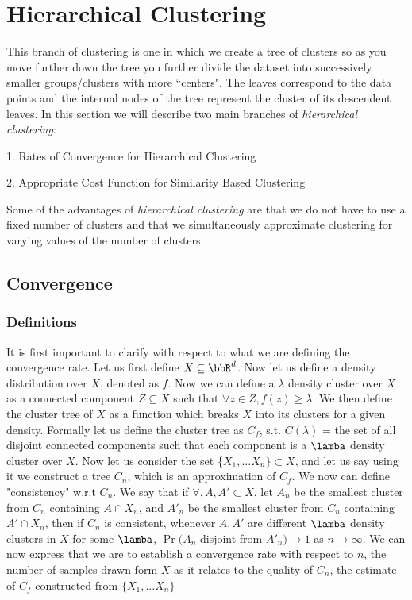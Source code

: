 \documentclass{article}
\begin{document}
\section{Hierarchical Clustering}

This branch of clustering is one in which we create a tree of clusters so as you move further down the tree you further divide the dataset into successively smaller groups/clusters with more ``centers". The leaves correspond to the data points and the internal nodes of the tree represent the cluster of its descendent leaves. In this section we will describe two main branches of \textit{hierarchical clustering}: 


1. Rates of Convergence for Hierarchical Clustering

2. Appropriate Cost Function for Similarity Based Clustering

Some of the advantages of \textit{hierarchical clustering} are that we do not have to use a fixed number of clusters and that we simultaneously approximate clustering for varying values of the number of clusters.

\subsection{Convergence}

\subsubsection{Definitions}
It is first important to clarify with respect to what we are defining the convergence rate.  Let us first define $X \subseteq \bbR^d$.  Now let us define a density distribution over $X$, denoted as $f$.  Now we can define a  $\lambda$  density cluster over $X$ as a connected component $Z \subseteq X$ such that $\forall z \in Z, f(z) \geq \lambda$.  We then define the cluster tree of $X$ as a function which breaks $X$ into its clusters for a given density.  Formally let us define the cluster tree as $C_f$, s.t. $C(\lambda)$ = the set of all disjoint connected components such that each component is a $\lamba$ density cluster over $X$.  Now let us consider the set \{$X_1, ... X_n\} \subset X$, and let us say using it we construct a tree $C_n$, which is an approximation of $C_f$.  We now can define "consistency" w.r.t $C_n$.  We say that if $\forall, A, A' \subset X$, let $A_n$ be the smallest cluster from $C_n$ containing $A \cap X_n$, and $A'_n$ be the smallest cluster from $C_n$ containing $A' \cap X_n$, then if $C_n$ is consistent, whenever $A, A'$ are different $\lamba$ density clusters in $X$ for some $\lamba$, $\Pr(A_n$ disjoint from $A'_n) \rightarrow 1$ as $n \rightarrow \infty$.  We can now express that we are to establish a convergence rate with respect to $n$, the number of samples drawn form $X$ as it relates to the quality of $C_n$, the estimate of $C_f$ constructed from $\{X_1, ... X_n\}$
\end{document}
